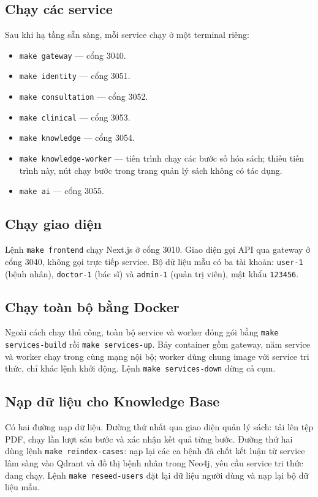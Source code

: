 \subsection{Chạy các service}

Sau khi hạ tầng sẵn sàng, mỗi service chạy ở một terminal riêng:

\begin{itemize}
  \item \texttt{make gateway} — cổng 3040.
  \item \texttt{make identity} — cổng 3051.
  \item \texttt{make consultation} — cổng 3052.
  \item \texttt{make clinical} — cổng 3053.
  \item \texttt{make knowledge} — cổng 3054.
  \item \texttt{make knowledge-worker} — tiến trình chạy các bước số hóa sách; thiếu tiến trình này, nút chạy bước trong trang quản lý sách không có tác dụng.
  \item \texttt{make ai} — cổng 3055.
\end{itemize}

\subsection{Chạy giao diện}

Lệnh \texttt{make frontend} chạy Next.js ở cổng 3010. Giao diện gọi API qua gateway ở cổng 3040, không gọi trực tiếp service. Bộ dữ liệu mẫu có ba tài khoản: \texttt{user-1} (bệnh nhân), \texttt{doctor-1} (bác sĩ) và \texttt{admin-1} (quản trị viên), mật khẩu \texttt{123456}.

\subsection{Chạy toàn bộ bằng Docker}

Ngoài cách chạy thủ công, toàn bộ service và worker đóng gói bằng \texttt{make services-build} rồi \texttt{make services-up}. Bảy container gồm gateway, năm service và worker chạy trong cùng mạng nội bộ; worker dùng chung image với service tri thức, chỉ khác lệnh khởi động. Lệnh \texttt{make services-down} dừng cả cụm.

\subsection{Nạp dữ liệu cho Knowledge Base}

Có hai đường nạp dữ liệu. Đường thứ nhất qua giao diện quản lý sách: tải lên tệp PDF, chạy lần lượt sáu bước và xác nhận kết quả từng bước. Đường thứ hai dùng lệnh \texttt{make reindex-cases}: nạp lại các ca bệnh đã chốt kết luận từ service lâm sàng vào Qdrant và đồ thị bệnh nhân trong Neo4j, yêu cầu service tri thức đang chạy. Lệnh \texttt{make reseed-users} đặt lại dữ liệu người dùng và nạp lại bộ dữ liệu mẫu.

